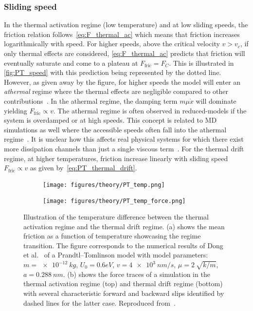 \subsubsection{Sliding speed}
In the thermal activation regime (low temperature) and at low sliding speeds, the
friction relation follows~\cref{eq:F_thermal_ac} which means that friction
increases logarithmically with speed. For higher speeds, above the critical
velocity $v > v_c$, if only thermal effects are considered,
\cref{eq:F_thermal_ac} predicts that friction will eventually saturate and come
to a plateau at $F_{\text{fric}} = F_C$. This is illustrated in
\cref{fig:PT_speed} with this prediction being represented by the dotted line.
However, as given away by the figure, for higher speeds the model will enter an
\textit{athermal} regime where the thermal effects are negligible compared to
other contributions~\cite{PhysRevLett.89.224301}. In the athermal regime, the
damping term $m\mu \dot{x}$ will dominate yielding $F_{\text{fric}}\propto v$.
The athermal regime is often observed in reduced-models if the system is
overdamped or at high speeds. This concept is related to \acrshort{MD}
simulations as well where the accessible speeds often fall into the athermal
regime~\cite{Li_2011}. It is unclear how this affects real physical systems for
which there exist more dissipation channels than just a single viscous
term~\cite{Dong_2013}. For the thermal drift regime, at higher temperatures, friction increase linearly with sliding speed $F_{\text{fric}} \propto v$ as given by~\cref{eq:PT_thermal_drift}.


\begin{figure}[!htb]
  \centering
  \begin{subfigure}[t]{0.49\textwidth}
      \centering
      \texttt{[image: figures/theory/PT\_temp.png]}
      \caption{}
      \label{fig:PT_temp_a}
  \end{subfigure}
  \hfill
  \begin{subfigure}[t]{0.49\textwidth}
      \centering
      \texttt{[image: figures/theory/PT\_temp\_force.png]}
      \caption{}
      \label{fig:PT_temp_b}
  \end{subfigure}
  \hfill
  \hfill
     \caption{Illustration of the temperature difference between the thermal activation regime and the thermal drift regime. (a) shows the mean friction as a function of temperature showcasing the regime transition. The figure corresponds to the numerical results of Dong et al.~\cite{Yalin_2011} of a Prandtl–Tomlinson model with model parameters: $m=\SI{e-12}{kg}$, $U_0={0.6}{eV}$, $v=\SI{4e3}{nm/s}$, $\mu=\SI{2}{\sqrt{k/m}}$, $a=\SI{0.288}{nm}$. (b) shows the force traces of a simulation in the thermal activation regime (top) and thermal drift regime (bottom) with several characteristic forward and backward slips identified by dashed lines for the latter case. Reproduced from~\cite{Yalin_2011}.}
     \label{fig:PT_temp}
\end{figure}



